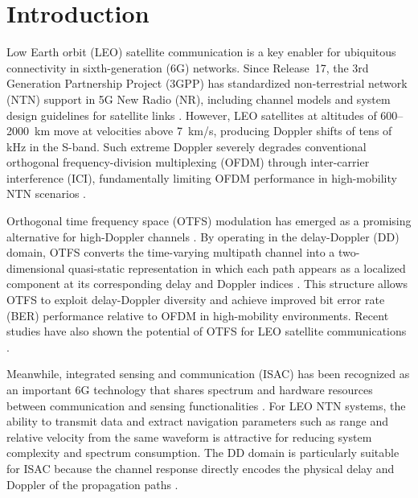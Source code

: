 ﻿\documentclass[conference]{IEEEtran}
\begin{document}
\section{Introduction}

Low Earth orbit (LEO) satellite communication is a key enabler for ubiquitous connectivity in sixth-generation (6G) networks. Since Release~17, the 3rd Generation Partnership Project (3GPP) has standardized non-terrestrial network (NTN) support in 5G New Radio (NR), including channel models and system design guidelines for satellite links \cite{3gpp_38811, 3gpp_38821}. However, LEO satellites at altitudes of 600--2000~km move at velocities above 7~km/s, producing Doppler shifts of tens of kHz in the S-band. Such extreme Doppler severely degrades conventional orthogonal frequency-division multiplexing (OFDM) through inter-carrier interference (ICI), fundamentally limiting OFDM performance in high-mobility NTN scenarios \cite{wang_ofdm_ici}.

Orthogonal time frequency space (OTFS) modulation has emerged as a promising alternative for high-Doppler channels \cite{hadani2017otfs}. By operating in the delay-Doppler (DD) domain, OTFS converts the time-varying multipath channel into a two-dimensional quasi-static representation in which each path appears as a localized component at its corresponding delay and Doppler indices \cite{raviteja2018interference}. This structure allows OTFS to exploit delay-Doppler diversity and achieve improved bit error rate (BER) performance relative to OFDM in high-mobility environments. Recent studies have also shown the potential of OTFS for LEO satellite communications \cite{otfs_leo_2023, otfs_leo_jsac2025}.

Meanwhile, integrated sensing and communication (ISAC) has been recognized as an important 6G technology that shares spectrum and hardware resources between communication and sensing functionalities \cite{dd_isac_2024}. For LEO NTN systems, the ability to transmit data and extract navigation parameters such as range and relative velocity from the same waveform is attractive for reducing system complexity and spectrum consumption. The DD domain is particularly suitable for ISAC because the channel response directly encodes the physical delay and Doppler of the propagation paths \cite{dd_isac_2024, gaudio2020otfs_radar}.
\end{document}
